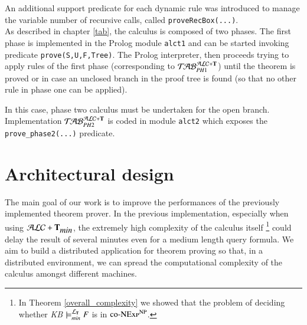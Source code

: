\documentclass[a4paper, 11pt, oneside]{elsarticle}
\newcommand{\tip}{{\bf T}}
\newcommand{\alctmin}{\mathcal{ALC}+\tip_{\mbox{\em min}}}
\newcommand{\ellet} {\mathcal{L}_{\bf T}}
\newcommand{\primo}{\mathrel{{\mathcal{T}\!\mathcal{AB}}}_{PH 1}^{\mathcal{ALC}+\mbox{\scriptsize $\tip$}}}
\newcommand{\secondo}{\mathrel{{\mathcal{T}\!\mathcal{AB}}}_{PH 2}^{\mathcal{ALC}+\mbox{\scriptsize $\tip$}}}
\begin{document}
\newpage

An additional support predicate for each dynamic rule was introduced to manage the variable number of recursive calls, called \texttt{proveRecBox(...)}.\\

As described in chapter \ref{tab}, the calculus is composed of two phases.
The first phase is implemented in the Prolog module \texttt{alct1} and can be started invoking predicate \texttt{prove(S,U,F,Tree)}. The Prolog interpreter, then proceeds trying to apply rules of the first phase (corresponding to $\primo$) until the theorem is proved or in case an unclosed branch in the proof tree is found (so that no other rule in phase one can be applied).

In this case, phase two calculus must be undertaken for the open branch.
Implementation $\secondo$ is coded in module \texttt{alct2} which exposes the \texttt{prove\_phase2(...)} predicate.

\newpage




























\section{Architectural design}\label{arch}

The main goal of our work is to improve the performances of the previously implemented theorem prover.
In the previous implementation, especially when using $\alctmin$, the extremely high complexity of the calculus itself
\footnote{In Theorem \ref{overall_complexity} we showed that the problem of deciding whether \emph{KB} $\models_{min}^{\ellet} F$ is in $\textsc{co-NExp}^\textsc{NP}$.}
could delay the result of several minutes even for a medium length query formula.
We aim to build a distributed application for theorem proving so that, in a distributed environment, we can spread the computational complexity of the calculus amongst different machines.\\
\end{document}
